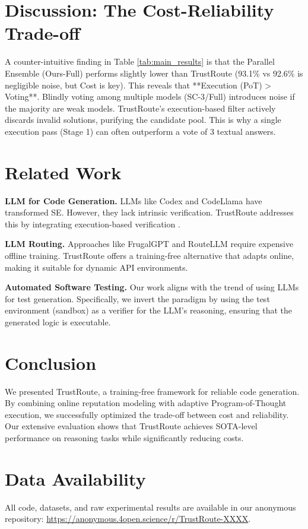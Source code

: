 \documentclass[acmsmall,screen,review,anonymous]{acmart}
\begin{document}
\section{Discussion: The Cost-Reliability Trade-off}
A counter-intuitive finding in Table \ref{tab:main_results} is that the Parallel Ensemble (Ours-Full) performs slightly lower than TrustRoute (93.1\% vs 92.6\% is negligible noise, but Cost is key). This reveals that **Execution (PoT) > Voting**. Blindly voting among multiple models (SC-3/Full) introduces noise if the majority are weak models. TrustRoute's execution-based filter actively discards invalid solutions, purifying the candidate pool. This is why a single execution pass (Stage 1) can often outperform a vote of 3 textual answers.

\section{Related Work}

\textbf{LLM for Code Generation.} LLMs like Codex \cite{chen2021codex} and CodeLlama \cite{roziere2023codellama} have transformed SE. However, they lack intrinsic verification. TrustRoute addresses this by integrating execution-based verification \cite{gao2022pal}.

\textbf{LLM Routing.} Approaches like FrugalGPT \cite{chen2023frugalgpt} and RouteLLM \cite{ong2024routellm} require expensive offline training. TrustRoute offers a training-free alternative that adapts online, making it suitable for dynamic API environments.

\textbf{Automated Software Testing.} Our work aligns with the trend of using LLMs for test generation. Specifically, we invert the paradigm by using the test environment (sandbox) as a verifier for the LLM's reasoning, ensuring that the generated logic is executable.

\section{Conclusion}

We presented TrustRoute, a training-free framework for reliable code generation. By combining online reputation modeling with adaptive Program-of-Thought execution, we successfully optimized the trade-off between cost and reliability. Our extensive evaluation shows that TrustRoute achieves SOTA-level performance on reasoning tasks while significantly reducing costs.

\section*{Data Availability}
All code, datasets, and raw experimental results are available in our anonymous repository: \url{https://anonymous.4open.science/r/TrustRoute-XXXX}.



\end{document}
